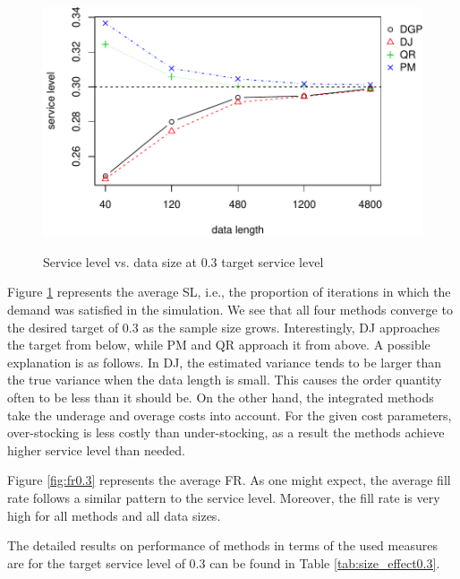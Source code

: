 \documentclass{article}
\begin{document}
\begin{figure}[ht]
\centering
\caption{Service level vs. data size at 0.3 target service level}
\includegraphics{linear-norm-plot_files/figure-latex/sl-3.pdf}
\label{fig:sl0.3}
\end{figure}

Figure \ref{fig:sl0.3} represents the average SL, i.e., the proportion of iterations in which the demand was satisfied in the simulation.
We see that all four methods converge to the desired target of 0.3 as the sample size grows. Interestingly, DJ approaches the target from below, while PM and QR approach it from above. A possible explanation is as follows. In DJ, the estimated variance tends to be larger than the true variance when the data length is small. This causes the order quantity often to be less than it should be. On the other hand, the integrated methods take the underage and overage costs into account. For the given cost parameters, over-stocking is less costly than under-stocking, as a result the methods achieve higher service level than needed.

Figure \ref{fig:fr0.3} represents the average FR. As one might expect, the average fill rate follows a similar pattern to the service level. Moreover, the fill rate is very high for all methods and all data sizes.

The detailed results on performance of methods in terms of the used measures are for the target service level of 0.3 can be found in Table \ref{tab:size_effect0.3}.
\end{document}
